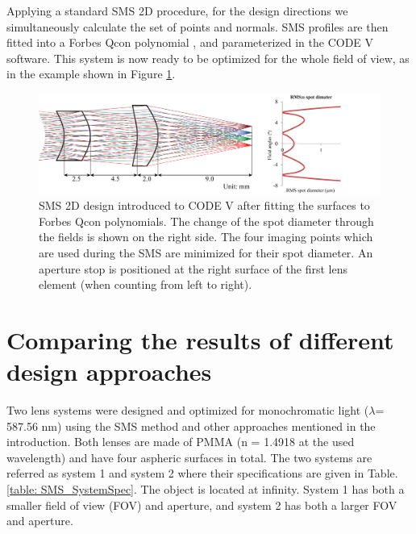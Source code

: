 Applying a standard SMS 2D procedure, for the design directions we simultaneously calculate the set of points and normals. SMS profiles are then fitted into a Forbes Qcon polynomial \cite{ForbesOE07}, and parameterized in the CODE V software. This system is now ready to be optimized for the whole field of view, as in the example shown in Figure \ref{fig: fig2_SMSdesignedSys}. 

\begin{figure}[h!]
    \centering
    \includegraphics[width=1\textwidth]{chapter-5/figures/Fig2_SMSdesignedSystem.png}
    \caption{SMS 2D design introduced to CODE V after fitting the surfaces to Forbes Qcon polynomials. The change of the spot diameter through the fields is shown on the right side. The four imaging points which are used during the SMS are minimized for their spot diameter. An aperture stop is positioned at the right surface of the first lens element (when counting from left to right).  }
    \label{fig: fig2_SMSdesignedSys}
\end{figure}

\section{Comparing the results of different design approaches}
Two lens systems were designed and optimized for monochromatic light ($\lambda$= 587.56 nm) using the SMS method and other approaches mentioned in the introduction. Both lenses are made of PMMA (n = 1.4918 at the used wavelength) and have four aspheric surfaces in total. The two systems are referred as system 1 and system 2 where their specifications are given in Table. \ref{table: SMS_SystemSpec}. The object is located at infinity. System 1 has both a smaller field of view (FOV) and aperture, and system 2 has both a larger FOV and aperture. 


